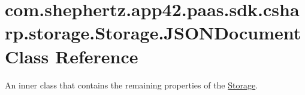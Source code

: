 \hypertarget{classcom_1_1shephertz_1_1app42_1_1paas_1_1sdk_1_1csharp_1_1storage_1_1_storage_1_1_j_s_o_n_document}{\section{com.\+shephertz.\+app42.\+paas.\+sdk.\+csharp.\+storage.\+Storage.\+J\+S\+O\+N\+Document Class Reference}
\label{classcom_1_1shephertz_1_1app42_1_1paas_1_1sdk_1_1csharp_1_1storage_1_1_storage_1_1_j_s_o_n_document}
}


An inner class that contains the remaining properties of the \hyperlink{classcom_1_1shephertz_1_1app42_1_1paas_1_1sdk_1_1csharp_1_1storage_1_1_storage}{Storage}.  


